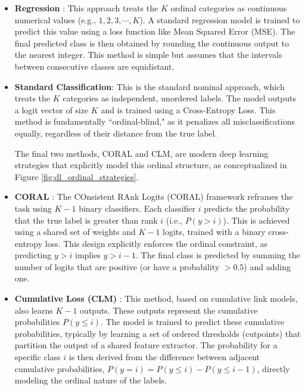 \begin{itemize}
    \item \textbf{Regression} \citep{Frank2001}: This approach treats the $K$ ordinal categories as continuous numerical values (e.g., $1, 2, 3, \cdots, K$). A standard regression model is trained to predict this value using a loss function like Mean Squared Error (MSE). The final predicted class is then obtained by rounding the continuous output to the nearest integer. This method is simple but assumes that the intervals between consecutive classes are equidistant.
    
    \item \textbf{Standard Classification}: This is the standard nominal approach, which treats the $K$ categories as independent, unordered labels. The model outputs a logit vector of size $K$ and is trained using a Cross-Entropy Loss. This method is fundamentally ``ordinal-blind," as it penalizes all misclassifications equally, regardless of their distance from the true label.

    The final two methods, CORAL and CLM, are modern deep learning strategies that explicitly model this ordinal structure, as conceptualized in Figure \ref{fig:dl_ordinal_strategies}.
    
    \item \textbf{CORAL} \citep{Cao2020}: The COnsistent RAnk Logits (CORAL) framework reframes the task using $K-1$ binary classifiers. Each classifier $i$ predicts the probability that the true label is greater than rank $i$ (i.e., $P(y > i)$). This is achieved using a shared set of weights and $K-1$ logits, trained with a binary cross-entropy loss. This design explicitly enforces the ordinal constraint, as predicting $y > i$ implies $y > i-1$. The final class is predicted by summing the number of logits that are positive (or have a probability $> 0.5$) and adding one.
    
    \item \textbf{Cumulative Loss (CLM)} \citep{Niu2016}: This method, based on cumulative link models, also learns $K-1$ outputs. These outputs represent the cumulative probabilities $P(y \le i)$. The model is trained to predict these cumulative probabilities, typically by learning a set of ordered thresholds (cutpoints) that partition the output of a shared feature extractor. The probability for a specific class $i$ is then derived from the difference between adjacent cumulative probabilities, $P(y=i)=P(y \le i)-P(y \le i-1)$, directly modeling the ordinal nature of the labels.
\end{itemize}

